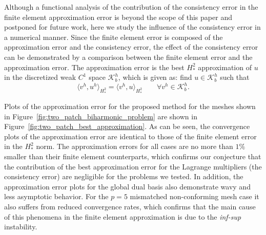 Although a functional analysis of the contribution of the consistency error in the finite element approximation error is beyond the scope of this paper and postponed for future work, here we study the influence of the consistency error in a numerical manner. Since the finite element error is composed of the approximation error and the consistency error, the effect of the consistency error can be demonstrated by a comparison between the finite element error and the approximation error. The approximation error is the best $H^2_*$ approximation of $u$ in the discretized weak $C^1$ space $\mathcal{K}_b^h$, which is given as: find $u\in\mathcal{K}_b^h$ such that
\begin{equation}
	\langle{v^h,u^h}\rangle_{H^2_*}= \langle{v^h,u}\rangle_{H^2_*}\quad\quad\forall{v^h\in\mathcal{K}_b^h}.
\end{equation}

Plots of the approximation error for the proposed method for the meshes shown in Figure~\ref{fig:two_patch_biharmonic_problem} are shown in Figure~\ref{fig:two_patch_best_approximation}. As can be seen, the convergence plots of the approximation error are identical to those of the finite element error in the $H^2_*$ norm. The approximation errors for all cases are no more than $1\%$ smaller than their finite element counterparts, which confirms our conjecture that the contribution of the best approximation error for the Lagrange multipliers (the consistency error) are negligible for the problems we tested. In addition, the approximation error plots for the global dual basis also demonstrate wavy and less asymptotic behavior. For the $p=5$ mismatched non-conforming mesh case it also suffers from reduced convergence rates, which confirms that the main cause of this phenomena in the finite element approximation is due to the \textit{inf-sup} instability.\par


